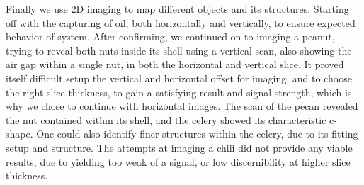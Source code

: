 \documentclass[11 pt]{article}
\begin{document}
 
Finally we use 2D imaging to map different objects and its structures. Starting off with the capturing  of  oil, both horizontally and vertically, to ensure expected behavior of system. After confirming, we continued on to imaging a peanut, trying to reveal both nuts inside its shell using a vertical scan, also showing the air gap within a single nut, in both the horizontal and vertical slice.
It proved itself difficult setup the vertical and horizontal offset for imaging, and to choose the right slice thickness, to gain a satisfying result and signal strength, which is why we chose to continue with horizontal images. The scan of the pecan revealed the nut contained within its shell, and the celery showed its characteristic c-shape. One could also identify finer structures within the celery, due to its fitting setup and structure.
The attempts at imaging a chili did not provide any viable results, due to yielding too weak of a signal, or low discernibility at higher slice thickness.
\end{document}
